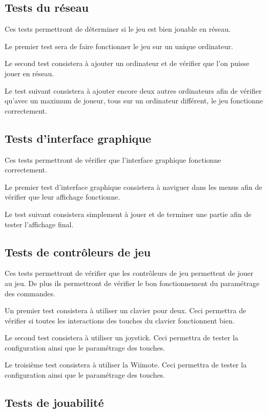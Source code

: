 \subsection{Tests du réseau}

Ces tests permettront de déterminer si le jeu est bien jouable en réseau.

Le premier test sera de faire fonctionner le jeu sur un unique ordinateur.

Le second test consistera à ajouter un ordinateur et de vérifier que l'on puisse jouer en réseau.

Le test suivant consistera à ajouter encore deux autres ordinateurs afin de vérifier qu'avec un maximum de joueur, tous sur un ordinateur différent, le jeu fonctionne correctement.

\subsection{Tests d'interface graphique}

Ces tests permettront de vérifier que l'interface graphique fonctionne correctement.

Le premier test d'interface graphique consistera à naviguer dans les menus afin de vérifier que leur affichage fonctionne.

Le test suivant consistera simplement à jouer et de terminer une partie afin de tester l'affichage final.

\subsection{Tests de contrôleurs de jeu}

Ces tests permettront de vérifier que les contrôleurs de jeu permettent de jouer au jeu. De plus ils permettront de vérifier le bon fonctionnement du paramétrage des commandes.

Un premier test consistera à utiliser un clavier pour deux. Ceci permettra de vérifier si toutes les interactions des touches du clavier fonctionnent bien.

Le second test consistera à utiliser un joystick. Ceci permettra de tester la configuration ainsi que le paramétrage des touches.

Le troisième test consistera à utiliser la Wiimote. Ceci permettra de tester la configuration ainsi que le paramétrage des touches.

\subsection{Tests de jouabilité}

